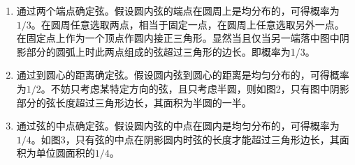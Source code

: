 \begin{enumerate}
\item 通过两个端点确定弦。假设圆内弦的端点在圆周上是均分布的，可得概率为$1/3$。在圆周任意选取两点，相当于固定一点，在圆周上任意选取另外一点。在固定点上作为一个顶点作圆内接正三角形。显然当且仅当另一端落中图中阴影部分的圆弧上时此两点组成的弦超过三角形的边长。即概率为1/3。
\item 通过到圆心的距离确定弦。假设圆内弦到圆心的距离是均匀分布的，可得概率为$1/2$。不妨只考虑某特定方向的弦，且只考虑半圆，则如图2，只有图中阴影部分的弦长度超过三角形边长，其面积为半圆的一半。
\item 通过弦的中点确定弦。假设圆内弦的中点在圆内是均匀分布的，可得概率为$1/4$。如图3，只有弦的中点在阴影圆内时弦的长度才能超过三角形边长，其面积为单位圆面积的$1/4$。
\end{enumerate}

